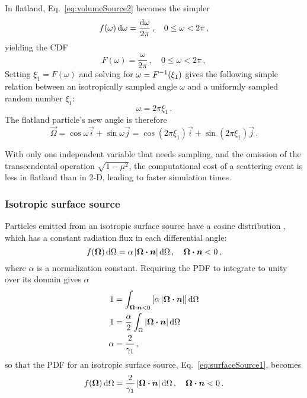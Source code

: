 In flatland, Eq.~\eqref{eq:volumeSource2} becomes the simpler
\begin{equation*}
  f(\omega) \mathop{}\!\mathrm{d}\omega = \frac{\mathop{}\!\mathrm{d}\omega}{2\pi} \,,
  \quad 0 \le \omega < 2\pi\,,
\end{equation*}
yielding the CDF
\begin{equation}\label{eq:volumeSourceFlatland}
  F(\omega) = \frac{\omega}{2\pi}\,,
  \quad 0 \le \omega < 2\pi\,,
\end{equation}
Setting $\xi_1 = F(\omega)$ and solving for $\omega = F^{-1}(\xi_1)$ gives the
following simple relation between an isotropically sampled angle $\omega$ and a
uniformly sampled random number $\xi_1$:
\begin{equation*}
  \omega = 2\pi \xi_1\,.
\end{equation*}
The flatland particle's new angle is therefore
\begin{equation*}
  \vec{\Omega} = \cos \omega \vec{i} + \sin \omega \vec{j}
  = \cos(2\pi\xi_1) \vec{i} + \sin(2\pi\xi_1) \vec{j}\,.
\end{equation*}

With only one independent variable that needs sampling, and the omission of
the transcendental operation $\sqrt{1-\mu^2}$, the computational cost of a
scattering event is less in flatland than in 2-D, leading to
faster simulation times.

\subsubsection{Isotropic surface source}\label{sec:isoSurface}
Particles emitted from an isotropic surface source have a cosine distribution
\cite{Gre2002}, which has a constant radiation flux in each differential
angle:
\begin{equation}\label{eq:surfaceSource1}
  f(\bm{\Omega}) \mathop{}\!\mathrm{d} \Omega = \alpha \left| \bm{\Omega}\bm{\cdot} \bm{n} \right| \mathop{}\!\mathrm{d} \Omega \,,
\quad \bm{\Omega}\bm{\cdot} \bm{n} < 0 \,,
\end{equation}
where $\alpha$ is a normalization constant.
Requiring the PDF to integrate to unity over its domain gives $\alpha$
\begin{align*}
  1 &= \int_{\bm{\Omega}\bm{\cdot} \bm{n} < 0} \left[ \alpha \left| \bm{\Omega}\bm{\cdot}
  \bm{n} \right| \right] \mathop{}\!\mathrm{d}\Omega
  \\
  1 &=\frac{\alpha}{2} \int_{\Omega} \left| \bm{\Omega}\bm{\cdot} \bm{n} \right| \mathop{}\!\mathrm{d}\Omega
  \\
  \alpha &= \frac{2}{\gamma_1}\,,
\end{align*}
so that the PDF for an isotropic surface source,
Eq.~\eqref{eq:surfaceSource1}, becomes
\begin{equation}\label{eq:surfaceSource2}
  f(\bm{\Omega}) \mathop{}\!\mathrm{d} \Omega = \frac{2}{\gamma_1} \left| \bm{\Omega}\bm{\cdot} \bm{n} \right| \mathop{}\!\mathrm{d} \Omega \,,
\quad \bm{\Omega}\bm{\cdot} \bm{n} < 0 \,.
\end{equation}

